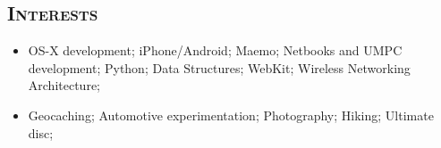 \begin{resume}
\section{\textsc{Interests}}

\begin{itemize}
\item OS-X development; iPhone/Android; Maemo; Netbooks and UMPC development; Python; Data Structures; WebKit; Wireless Networking Architecture; 
\item Geocaching; Automotive experimentation; Photography; Hiking; Ultimate disc;
\end{itemize}


\begin{formatb}
  \\
  \body\\
\end{formatb}


\end{resume}

